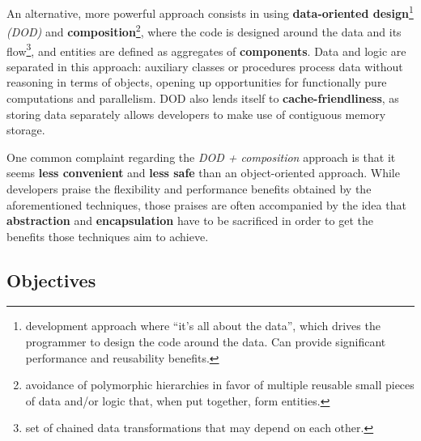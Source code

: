 \documentclass[twoside, 12pt, a4paper, openany]{book}
\begin{document}
An alternative, more powerful approach consists in using
\textbf{data-oriented design}\footnote{development approach where ``it's
  all about the data'', which drives the programmer to design the code
  around the data. Can provide significant performance and reusability
  benefits.} \emph{(DOD)} and \textbf{composition}\footnote{avoidance of
  polymorphic hierarchies in favor of multiple reusable small pieces of
  data and/or logic that, when put together, form entities.}, where the
code is designed around the data and its flow\footnote{set of chained
  data transformations that may depend on each other.}, and entities are
defined as aggregates of \textbf{components}. Data and logic are
separated in this approach: auxiliary classes or procedures process data
without reasoning in terms of objects, opening up opportunities for
functionally pure computations and parallelism. DOD also lends itself to
\textbf{cache-friendliness}, as storing data separately allows
developers to make use of contiguous memory storage.

One common complaint regarding the \emph{DOD + composition} approach is
that it seems \textbf{less convenient} and \textbf{less safe} than an
object-oriented approach. While developers praise the flexibility and
performance benefits obtained by the aforementioned techniques, those
praises are often accompanied by the idea that \textbf{abstraction} and
\textbf{encapsulation} have to be sacrificed in order to get the
benefits those techniques aim to achieve.

\subsection{Objectives}\label{objectives}
\end{document}
